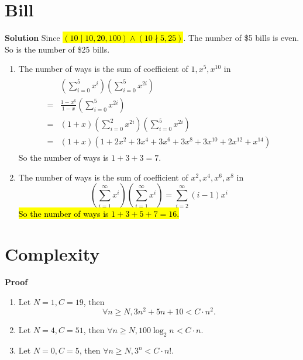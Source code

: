 \documentclass{../../cls/sig-alternate-05-2015}
\begin{document}
\section{Bill}
\textbf{Solution} Since \hl{$(10 \mid 10, 20, 100) \land (10 \nmid 5, 25)$}. The number of \$5 bills is even. So is the number of \$25 bills.
\begin{enumerate}[label=(\alph*)]
    \item The number of ways is the sum of coefficient of $1, x^5, x^{10}$ in \begin{align}
        \begin{aligned}
        & \left(\sum_{i = 0}^{5} x^{i}\right) \left(\sum_{i = 0}^{5} x^{2i}\right)\\
        = & \frac{1 - x^6}{1 - x} \left(\sum_{i = 0}^{5} x^{2i}\right)\\
        = & (1 + x) \left(\sum_{i = 0}^{2} x^{2i}\right) \left(\sum_{i = 0}^{5} x^{2i}\right)\\
        = & (1 + x) (1 + 2x^2 + 3x^4 + 3x^6 + 3x^8 + 3x^{10} + 2x^{12} + x^{14})
        \end{aligned}
    \end{align}
    So the number of ways is $1 + 3 + 3 = 7$.
    \item The number of ways is the sum of coefficient of $x^2, x^4, x^6, x^8$ in \begin{equation}
        \left(\sum_{i = 1}^{\infty} x^{i}\right) \left(\sum_{i = 1}^{\infty} x^{i}\right) = \sum_{i = 2}^{\infty} (i - 1) x^i
    \end{equation}
    \hl{So the number of ways is $1 + 3 + 5 + 7 = 16$.}
\end{enumerate}

\section{Complexity}
\textbf{Proof}\begin{enumerate}[label=(\alph*)]
    \item Let $N = 1, C = 19$, then \begin{equation}
        \forall n \ge N, 3n^2 + 5n + 10 < C \cdot n^2.
    \end{equation}
    \item Let $N = 4, C = 51$, then $\forall n \ge N, 100 \log_2 n < C \cdot n$.
    \item Let $N = 0, C = 5$, then $\forall n \ge N, 3^n < C \cdot n!$.
\end{enumerate}
\end{document}
